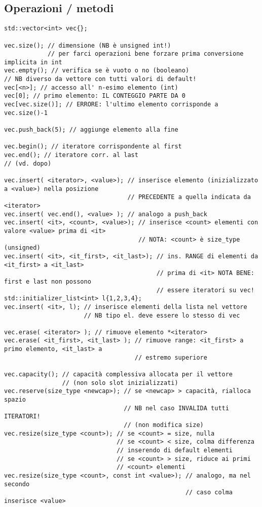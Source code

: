 \documentclass[10pt, oneside]{Book}
\begin{document}
\subsection{Operazioni / metodi}
\begin{verbatim}
std::vector<int> vec{};

vec.size(); // dimensione (NB è unsigned int!)
            // per farci operazioni bene forzare prima conversione implicita in int
vec.empty(); // verifica se è vuoto o no (booleano)
// NB diverso da vettore con tutti valori di default!
vec[<n>]; // accesso all' n-esimo elemento (int)
vec[0]; // primo elemento: IL CONTEGGIO PARTE DA 0
vec[vec.size()]; // ERRORE: l'ultimo elemento corrisponde a vec.size()-1

vec.push_back(5); // aggiunge elemento alla fine

vec.begin(); // iteratore corrispondente al first
vec.end(); // iteratore corr. al last 
// (vd. dopo)

vec.insert( <iterator>, <value>); // inserisce elemento (inizializzato a <value>) nella posizione 
                                  // PRECEDENTE a quella indicata da <iterator>
vec.insert( vec.end(), <value> ); // analogo a push_back
vec.insert( <it>, <count>, <value>); // inserisce <count> elementi con valore <value> prima di <it>
                                     // NOTA: <count> è size_type (unsigned)
vec.insert( <it>, <it_first>, <it_last>); // ins. RANGE di elementi da <it_first> a <it_last> 
                                          // prima di <it> NOTA BENE: first e last non possono 
                                          // essere iteratori su vec!
std::initializer_list<int> l{1,2,3,4};
vec.insert( <it>, l); // inserisce elementi della lista nel vettore
                      // NB tipo el. deve essere lo stesso di vec

vec.erase( <iterator> ); // rimuove elemento *<iterator>
vec.erase( <it_first>, <it_last> ); // rimuove range: <it_first> a primo elemento, <it_last> a
                                    // estremo superiore
                                    
vec.capacity(); // capacità complessiva allocata per il vettore
                // (non solo slot inizializzati)
vec.reserve(size_type <newcap>); // se <newcap> > capacità, rialloca spazio
                                 // NB nel caso INVALIDA tutti ITERATORI!
                                 // (non modifica size)
vec.resize(size_type <count>); // se <count> = size, nulla
                               // se <count> < size, colma differenza
                               // inserendo di default elementi 
                               // se <count> > size, riduce ai primi
                               // <count> elementi
vec.resize(size_type <count>, const int <value>); // analogo, ma nel secondo
                                                  // caso colma inserisce <value>

\end{verbatim}
\end{document}
